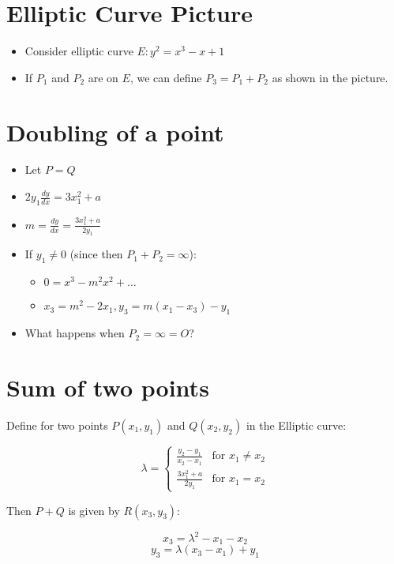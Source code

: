 \section*{Elliptic Curve Picture}

\begin{itemize}
	\item Consider elliptic curve \( E: y^2 = x^3 - x + 1 \)
	\item If \( P_1 \) and \( P_2 \) are on \( E \), we can define \( P_3 = P_1 + P_2 \) as shown in the picture.
\end{itemize}

\section*{Doubling of a point}

\begin{itemize}
	\item Let \( P=Q \)
	\item \( 2y_1 \frac{dy}{dx} = 3x_1^2 + a \)
	\item \( m = \frac{dy}{dx} = \frac{3x_1^2 + a}{2y_1} \)
	\item If \( y_1 \neq 0 \) (since then \( P_1 + P_2 = \infty \)):
	\begin{itemize}
		\item \( 0 = x^3 - m^2x^2 + \ldots \)
		\item \( x_3 = m^2 - 2x_1, y_3 = m(x_1 - x_3) - y_1 \)
	\end{itemize}
	\item What happens when \( P_2 = \infty = O \)?
\end{itemize}


\section*{Sum of two points}

Define for two points \( P (x_1, y_1) \) and \( Q (x_2, y_2) \) in the Elliptic curve:

\[ \lambda = \begin{cases} 
	\frac{y_2 - y_1}{x_2 - x_1} & \text{for } x_1 \neq x_2 \\
	\frac{3x_1^2 + a}{2y_1} & \text{for } x_1 = x_2
\end{cases} \]

Then \( P + Q \) is given by \( R(x_3, y_3) \):

\[ x_3 = \lambda^2 - x_1 - x_2 \]
\[ y_3 = \lambda(x_3 - x_1) + y_1 \]

